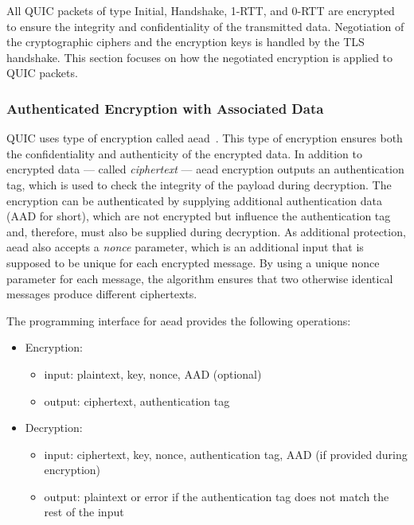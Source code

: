 All QUIC packets of type Initial, Handshake, 1-RTT, and 0-RTT are encrypted to ensure the integrity
and confidentiality of the transmitted data. Negotiation of the cryptographic ciphers and the
encryption keys is handled by the TLS handshake. This section focuses on how the negotiated
encryption is applied to QUIC packets.

\subsubsection{Authenticated Encryption with Associated Data}

QUIC uses type of encryption called \gls{aead}~\cite{rfc5116}. This type of encryption ensures both
the confidentiality and authenticity of the encrypted data. In addition to encrypted data --- called
\textit{ciphertext} --- \gls{aead} encryption outputs an authentication tag, which is used to check
the integrity of the payload during decryption. The encryption can be authenticated by supplying
additional authentication data (AAD for short), which are not encrypted but influence the
authentication tag and, therefore, must also be supplied during decryption. As additional
protection, \gls{aead} also accepts a \textit{nonce} parameter, which is an additional input that is
supposed to be unique for each encrypted message. By using a unique nonce parameter for each
message, the algorithm ensures that two otherwise identical messages produce different ciphertexts.

The programming interface for \gls{aead} provides the following operations:

\begin{itemize}

  \item Encryption:

  \begin{itemize}

    \item input: plaintext, key, nonce, AAD (optional)

    \item output: ciphertext, authentication tag

  \end{itemize}

  \item Decryption:

  \begin{itemize}

    \item input: ciphertext, key, nonce, authentication tag, AAD (if provided during encryption)

    \item output: plaintext or error if the authentication tag does not match the rest of the input

  \end{itemize}

\end{itemize}


